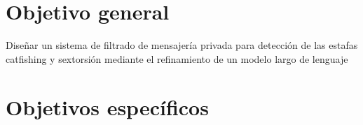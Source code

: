 \documentclass{article}
\begin{document}
\section{\label{ref-003}Objetivo general}

Diseñar un sistema de filtrado de mensajería privada para detección de las estafas catfishing y sextorsión mediante el refinamiento de un modelo largo de lenguaje





\section{\label{ref-004}Objetivos específicos}


\end{document}
